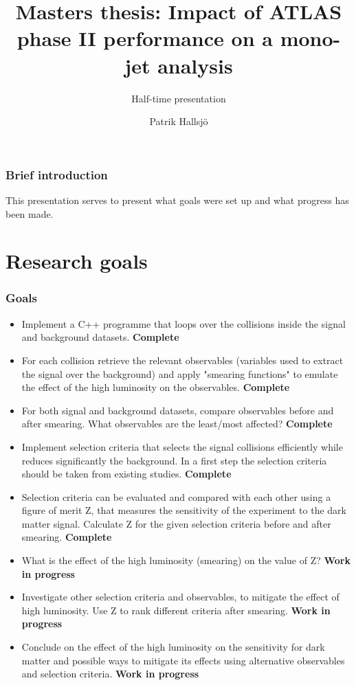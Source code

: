 \documentclass[•]{beamer}
\title{Masters thesis: Impact of ATLAS phase II performance on a mono-jet analysis}
\subtitle{Half-time presentation}
\author{Patrik Hallsj\"{o}}
\theoremstyle{remark}
\begin{document}
\begin{frame}
\titlepage
\end{frame}
\begin{frame}\frametitle{Brief introduction}
\begin{block}

This presentation serves to present what goals were set up and what progress has been made.
\end{block}
\end{frame}

\begin{frame}[allowframebreaks]
\tableofcontents
\end{frame}


\section{Research goals}
\begin{frame}[shrink=30]\frametitle{Goals}
\begin{itemize}
\item Implement a C++ programme that loops over the collisions inside the signal and background datasets.	 \textbf{Complete}
\item For each collision retrieve the relevant observables (variables used to	 extract the signal over the background) and apply "smearing functions" to emulate the effect of the high luminosity on the observables. \textbf{Complete}
\item For both signal and background datasets, compare observables before and after smearing. What observables are the least/most affected? \textbf{Complete}
\item Implement selection criteria that selects the signal collisions efficiently while reduces significantly the background. In a first step the selection criteria should be taken from existing studies. \textbf{Complete}
\item Selection criteria can be evaluated and compared with each other using a figure of merit Z, that measures the sensitivity of the experiment to the dark matter signal. Calculate Z for the given selection criteria before and after smearing. \textbf{Complete}
\item What is the effect of the high luminosity (smearing) on the value of Z?  \textbf{Work in progress}
\item Investigate other selection criteria and observables, to mitigate the effect of high luminosity. Use Z to rank different criteria after smearing.  \textbf{Work in progress}
\item Conclude on the effect of the high luminosity on the sensitivity for dark matter and possible ways to mitigate its effects using alternative observables and selection criteria. \textbf{Work in progress}
\end{itemize}
\end{frame}
\end{document}
